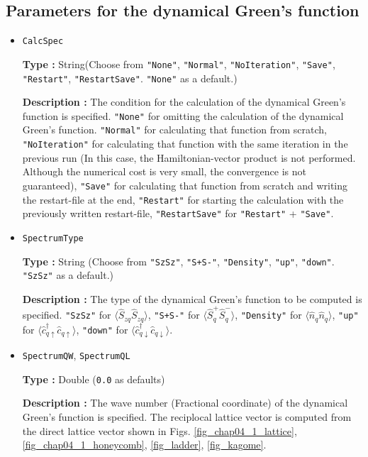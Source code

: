 \subsection{Parameters for the dynamical Green's function}

\begin{itemize}
\item \verb|CalcSpec|
  
  {\bf Type :} String(Choose from \verb|"None"|, \verb|"Normal"|, \verb|"NoIteration"|,  
  \verb|"Save"|, \verb|"Restart"|, \verb|"RestartSave"|. \verb|"None"| as a default.)

  {\bf Description :} The condition for the calculation of the dynamical
  Green's function is specified.
  \verb|"None"| for omitting the calculation of the
  dynamical Green's function.
  \verb|"Normal"| for calculating that function from scratch,
  \verb|"NoIteration"| for calculating that function
  with the same iteration in the previous run
  (In this case, the Hamiltonian-vector product is not performed.
  Although the numerical cost is very small, the convergence is not guaranteed),
  \verb|"Save"| for calculating that function from scratch
  and writing the restart-file at the end,
  \verb|"Restart"| for starting the calculation with the
  previously written restart-file,
  \verb|"RestartSave"| for \verb|"Restart"| + \verb|"Save"|.
  
\item \verb|SpectrumType|
  
  {\bf Type :} String (Choose from \verb|"SzSz"|, \verb|"S+S-"|, \verb|"Density"|,  
  \verb|"up"|, \verb|"down"|. \verb|"SzSz"| as a default.)

  {\bf Description :} The type of the dynamical Green's function
  to be computed is specified.
  \verb|"SzSz"| for $\langle {\hat S}_{z q} {\hat S}_{z q}\rangle$,
  \verb|"S+S-"| for $\langle {\hat S}^{+}_{q} {\hat S}^{-}_{q}\rangle$,
  \verb|"Density"| for $\langle {\hat n}_{q} {\hat n}_{q}\rangle$,
  \verb|"up"| for $\langle {\hat c}^{\dagger}_{q \uparrow} {\hat c}_{q \uparrow}\rangle$,
  \verb|"down"| for $\langle {\hat c}^{\dagger}_{q \downarrow} {\hat c}_{q \downarrow}\rangle$.

\item \verb|SpectrumQW|, \verb|SpectrumQL|
  
  {\bf Type :} Double (\verb|0.0| as defaults)

  {\bf Description :} The wave number (Fractional coordinate) of the
  dynamical Green's function is specified.
  The reciplocal lattice vector is computed from the
  direct lattice vector shown in Figs.
  \ref{fig_chap04_1_lattice}, \ref{fig_chap04_1_honeycomb},
  \ref{fig_ladder}, \ref{fig_kagome}.


\end{itemize}
